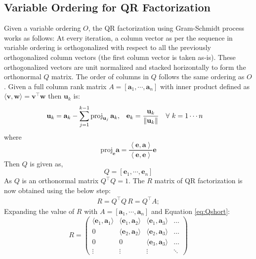 \subsection{Variable Ordering for QR Factorization}
Given a variable ordering $O$, the QR factorization using Gram-Schmidt process works as follows: At every iteration, a column vector as per the sequence in variable ordering is orthogonalized with respect to all the previously orthogonalized column vectors (the first column vector is taken as-is). These orthogonalized vectors are unit normalized and stacked horizontally to form the orthonormal $Q$ matrix. The order of columns in $Q$ follows the same ordering as $O$. Given a full column rank matrix $A=[\mathbf{a}_{1},\cdots ,\mathbf{a} _{n}]$ with inner product defined as $\langle \mathbf {v} ,\mathbf {w} \rangle =\mathbf {v} ^{\top }\mathbf {w}$ then $\textbf{u}_k$ is:
\begin{align}
 \mathbf{u}_k &= \mathbf{a}_k-\sum_{j=1}^{k-1}\mathrm{proj}_{\mathbf{u}_j}\,\mathbf{a}_k,
  &\mathbf{e}_k &= {\mathbf{u}_k\over\|\mathbf{u}_k\|} & \forall \ k &= 1 \cdots n 
\end{align}
where
\begin{equation}
\mathrm {proj} _{\mathbf {e} }\mathbf {a} ={\frac {\left\langle \mathbf {e} ,\mathbf {a} \right\rangle }{\left\langle \mathbf {e} ,\mathbf {e} \right\rangle }}{\mathbf {e} }
\end{equation}
Then $Q$ is given as,
\begin{equation}
Q=\left[\mathbf {e} _{1},\cdots ,\mathbf {e} _{n}\right]
\label{eq:Qshort}
\end{equation}
As $Q$ is an orthonormal matrix $Q^{\top}Q = 1$. The $R$ matrix of QR factorization is now obtained using the below step:
\begin{equation}
\begin{matrix}
R = Q^{\top }Q\,R = Q^{\top } A;
\end{matrix}
\end{equation}
Expanding the value of $R$ with $A=[\mathbf{a}_{1},\cdots ,\mathbf{a} _{n}]$ and Equation \ref{eq:Qshort}:
\begin{equation}
R={\begin{pmatrix}\langle \mathbf {e} _{1},\mathbf {a} _{1}\rangle &\langle \mathbf {e} _{1},\mathbf {a} _{2}\rangle &\langle \mathbf {e} _{1},\mathbf {a} _{3}\rangle &\ldots \\0&\langle \mathbf {e} _{2},\mathbf {a} _{2}\rangle &\langle \mathbf {e} _{2},\mathbf {a} _{3}\rangle &\ldots \\0&0&\langle \mathbf {e} _{3},\mathbf {a} _{3}\rangle &\ldots \\\vdots &\vdots &\vdots &\ddots \end{pmatrix}}
\label{eq:R}
\end{equation}
